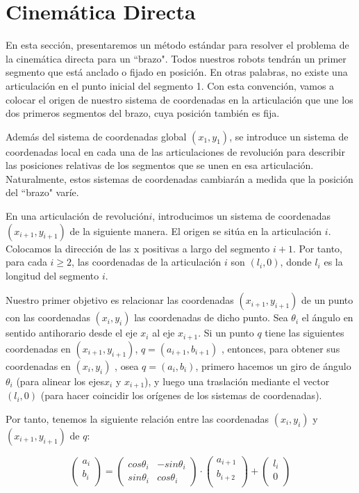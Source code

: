 \chapter{Cinemática Directa}

En esta sección, presentaremos un método estándar para resolver el problema de la cinemática directa para un ``brazo". Todos nuestros robots tendrán un primer segmento que está anclado o fijado en posición. En otras palabras, no existe una articulación en el punto inicial del segmento 1. Con esta convención, vamos a colocar el origen de nuestro sistema de coordenadas en la articulación que une los dos primeros segmentos del brazo, cuya posición también es fija.

Además del sistema de coordenadas global $(x_{1}, y_{1})$, se introduce un sistema de coordenadas local en cada una de las articulaciones de revolución para describir las posiciones relativas de los segmentos que se unen en esa articulación. Naturalmente, estos sistemas de coordenadas cambiarán a medida que la posición del ``brazo" varíe.

En una articulación de revolución$i$, introducimos un sistema de coordenadas $(x_{i+1},y_{i+1})$ de la siguiente manera. 
El origen se sitúa en la articulación $i$. Colocamos la dirección de las x positivas a largo del segmento $i+1$. Por tanto, para cada $i\geq2$, las coordenadas de la articulación $i$ son $(l_{i},0)$, donde $l_{i}$ es la longitud del segmento $i$.

Nuestro primer objetivo es relacionar las coordenadas $(x_{i+1},y_{i+1})$ de un punto con las coordenadas $(x_{i},y_{i})$ las coordenadas de dicho punto. Sea $\theta_{i}$ el ángulo en sentido antihorario desde el eje $x_{i}$ al eje $x_{i+1}$. Si un punto $q$ tiene las siguientes coordenadas en $(x_{i+1},y_{i+1})$, $ q = (a_{i+1},b_{i+1})$ , entonces, para obtener sus coordenadas en $(x_{i},y_{i})$ , osea
$ q = (a_{i},b_{i})$, primero hacemos un giro de ángulo $\theta_{i}$ (para alinear los ejes$x_{i}$ y $x_{i+1}$), y luego una traslación mediante el vector $(l_{i},0)$ (para hacer coincidir los orígenes de los sistemas de coordenadas). 

Por tanto, tenemos la siguiente relación entre las coordenadas $(x_{i},y_{i})$ y $(x_{i+1},y_{i+1})$ de $q$:

\[
\begin{pmatrix} 
a_{i} \\ 
b_{i} \\
\end{pmatrix} = 
\begin{pmatrix} 
cos\theta_{i} & -sin\theta_{i} \\
sin\theta_{i} & cos\theta_{i} 
\end{pmatrix} \cdotp
\begin{pmatrix} 
a_{i+1} \\ 
b_{i+2} \\
\end{pmatrix} + 
\begin{pmatrix} 
l_{i} \\ 
0 \\
\end{pmatrix}
\]


